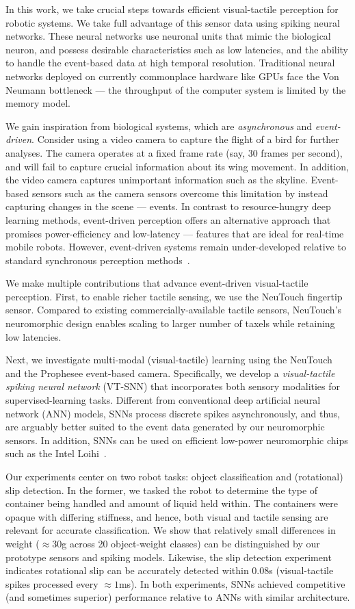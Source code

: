 \documentclass[fyp]{socreport}
\begin{document}
In this work, we take crucial steps towards efficient visual-tactile perception
for robotic systems. We take full advantage of this sensor data using spiking
neural networks. These neural networks use neuronal units that mimic the
biological neuron, and possess desirable characteristics such as low latencies,
and the ability to handle the event-based data at high temporal resolution.
Traditional neural networks deployed on currently commonplace hardware like GPUs
face the Von Neumann bottleneck --- the throughput of the computer system is
limited by the memory model.

We gain inspiration from biological systems, which are \emph{asynchronous} and
\emph{event-driven}. Consider using a video camera to capture the flight of a
bird for further analyses. The camera operates at a fixed frame rate (say, 30
frames per second), and will fail to capture crucial information about its wing
movement. In addition, the video camera captures unimportant information such as
the skyline. Event-based sensors such as the camera sensors overcome this
limitation by instead capturing changes in the scene --- events. In contrast to
resource-hungry deep learning methods, event-driven perception offers an
alternative approach that promises power-efficiency and low-latency --- features
that are ideal for real-time mobile robots. However, event-driven systems remain
under-developed relative to standard synchronous perception
methods~\cite{pfeiffer2018deep}.

We make multiple contributions that advance event-driven visual-tactile
perception. First, to enable richer tactile sensing, we use the NeuTouch
fingertip sensor. Compared to existing commercially-available tactile sensors,
NeuTouch's neuromorphic design enables scaling to larger number of taxels while
retaining low latencies.

Next, we investigate multi-modal (visual-tactile) learning using the NeuTouch
and the Prophesee event-based camera. Specifically, we develop a
\emph{visual-tactile spiking neural network} (VT-SNN) that incorporates both
sensory modalities for supervised-learning tasks. Different from conventional
deep artificial neural network (ANN) models, SNNs process discrete spikes
asynchronously, and thus, are arguably better suited to the event data generated
by our neuromorphic sensors. In addition, SNNs can be used on efficient
low-power neuromorphic chips such as the Intel Loihi~\cite{davies2018loihi}.

Our experiments center on two robot tasks: object classification and
(rotational) slip detection. In the former, we tasked the robot to determine the
type of container being handled and amount of liquid held within. The containers
were opaque with differing stiffness, and hence, both visual and tactile sensing
are relevant for accurate classification. We show that relatively small
differences in weight ($\approx 30$g across 20 object-weight classes) can be
distinguished by our prototype sensors and spiking models. Likewise, the slip
detection experiment indicates rotational slip can be accurately detected within
$0.08$s (visual-tactile spikes processed every $\approx 1$ms). In both
experiments, SNNs achieved competitive (and sometimes superior) performance
relative to ANNs with similar architecture.
\end{document}
